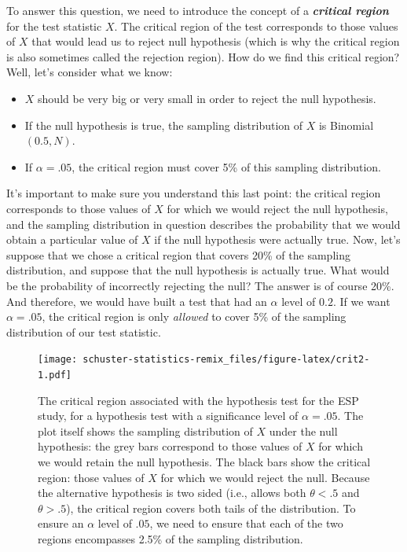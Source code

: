 \documentclass[
]{book}
\providecommand{\tightlist}{%
  \setlength{\itemsep}{0pt}\setlength{\parskip}{0pt}}
\begin{document}
To answer this question, we need to introduce the concept of a \textbf{\emph{critical region}} for the test statistic \(X\). The critical region of the test corresponds to those values of \(X\) that would lead us to reject null hypothesis (which is why the critical region is also sometimes called the rejection region). How do we find this critical region? Well, let's consider what we know:

\begin{itemize}
\tightlist
\item
  \(X\) should be very big or very small in order to reject the null hypothesis.
\item
  If the null hypothesis is true, the sampling distribution of \(X\) is Binomial\((0.5, N)\).
\item
  If \(\alpha =.05\), the critical region must cover 5\% of this sampling distribution.
\end{itemize}

It's important to make sure you understand this last point: the critical region corresponds to those values of \(X\) for which we would reject the null hypothesis, and the sampling distribution in question describes the probability that we would obtain a particular value of \(X\) if the null hypothesis were actually true. Now, let's suppose that we chose a critical region that covers 20\% of the sampling distribution, and suppose that the null hypothesis is actually true. What would be the probability of incorrectly rejecting the null? The answer is of course 20\%. And therefore, we would have built a test that had an \(\alpha\) level of \(0.2\). If we want \(\alpha = .05\), the critical region is only \emph{allowed} to cover 5\% of the sampling distribution of our test statistic.

\begin{figure}
\centering
\texttt{[image: schuster-statistics-remix\_files/figure-latex/crit2-1.pdf]}
\caption{\label{fig:crit2}The critical region associated with the hypothesis test for the ESP study, for a hypothesis test with a significance level of \(\alpha = .05\). The plot itself shows the sampling distribution of \(X\) under the null hypothesis: the grey bars correspond to those values of \(X\) for which we would retain the null hypothesis. The black bars show the critical region: those values of \(X\) for which we would reject the null. Because the alternative hypothesis is two sided (i.e., allows both \(\theta <.5\) and \(\theta >.5\)), the critical region covers both tails of the distribution. To ensure an \(\alpha\) level of \(.05\), we need to ensure that each of the two regions encompasses 2.5\% of the sampling distribution.}
\end{figure}
\end{document}
